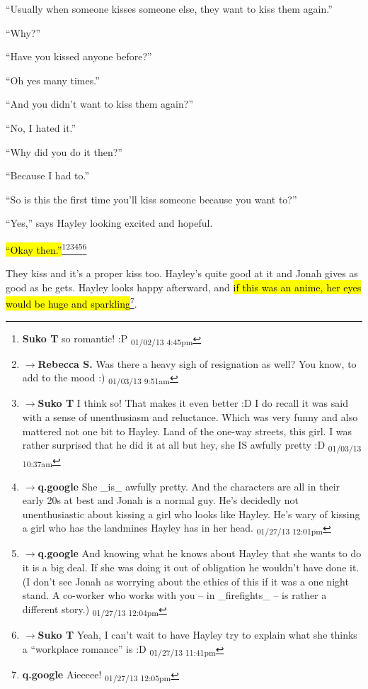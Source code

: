 ``Usually when someone kisses someone else, they want to kiss them again.''

``Why?''

``Have you kissed anyone before?''

``Oh yes many times.''

``And you didn't want to kiss them again?''

``No, I hated it.''

``Why did you do it then?''

``Because I had to.'' 

``So is this the first time you'll kiss someone because you want to?''

``Yes,'' says Hayley looking excited and hopeful.

\hl{``Okay then.''}\footnote{\textbf{Suko T }so romantic! :P \textsubscript{01/02/13 4:45pm}}\footnote{$\rightarrow$\textbf{Rebecca S. }Was there a heavy sigh of resignation as well?  You know, to add to the mood  :) \textsubscript{01/03/13 9:51am}}\footnote{$\rightarrow$\textbf{Suko T }I think so!  That makes it even better :D  I do recall it was said with a sense of unenthusiasm and reluctance.  Which was very funny and also mattered not one bit to Hayley.  Land of the one-way streets, this girl.  I was rather surprised that he did it at all but hey, she IS awfully pretty :D \textsubscript{01/03/13 10:37am}}\footnote{$\rightarrow$\textbf{q.google }She \_is\_ awfully pretty.  And the characters are all in their early 20s at best and Jonah is a normal guy.  He's decidedly not unenthusiastic about kissing a girl who looks like Hayley.  He's wary of kissing a girl who has the landmines Hayley has in her head. \textsubscript{01/27/13 12:01pm}}\footnote{$\rightarrow$\textbf{q.google }And knowing what he knows about Hayley that she wants to do it is a big deal.  If she was doing it out of obligation he wouldn't have done it.  (I don't see Jonah as worrying about the ethics of this if it was a one night stand.  A co-worker who works with you -- in \_firefights\_ -- is rather a different story.) \textsubscript{01/27/13 12:04pm}}\footnote{$\rightarrow$\textbf{Suko T }Yeah, I can't wait to have Hayley try to explain what she thinks a ``workplace romance'' is :D \textsubscript{01/27/13 11:41pm}}



They kiss and it's a proper kiss too.  Hayley's quite good at it and Jonah gives as good as he gets.  Hayley looks happy afterward, and \hl{if this was an anime, her eyes would be huge and sparkling}\footnote{\textbf{q.google }Aieeeee! \textsubscript{01/27/13 12:05pm}}.



